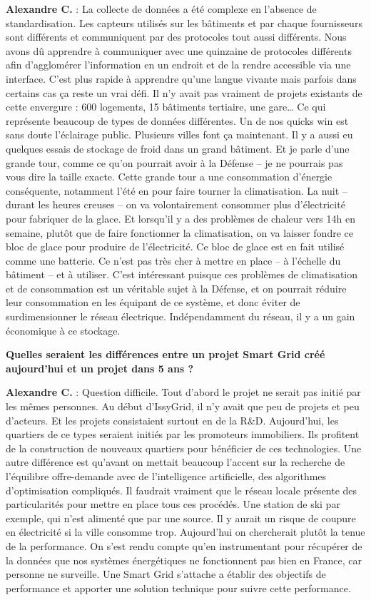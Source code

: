\textbf{Alexandre C.} :
La collecte de données a été complexe en l’absence de standardisation.
Les capteurs utilisés sur les bâtiments et par chaque fournisseurs sont différents et communiquent par des protocoles tout aussi différents.
Nous avons dû apprendre à communiquer avec une quinzaine de protocoles différents afin d’agglomérer l’information en un endroit
et de la rendre accessible via une interface.
C’est plus rapide à apprendre qu’une langue vivante mais parfois dans certains cas ça reste un vrai défi.
Il n’y avait pas vraiment de projets existants de cette envergure : 600 logements, 15 bâtiments tertiaire, une gare…
Ce qui représente beaucoup de types de données différentes.
Un de nos quicks win est sans doute l’éclairage public. Plusieurs villes font ça maintenant.
Il y a aussi eu quelques essais de stockage de froid dans un grand bâtiment.
Et je parle d’une grande tour, comme ce qu’on pourrait avoir à la Défense – je ne pourrais pas vous dire la taille exacte.
Cette grande tour a une consommation d’énergie conséquente, notamment l’été en pour faire tourner la climatisation.
La nuit – durant les heures creuses – on va volontairement consommer plus d’électricité pour fabriquer de la glace.
Et lorsqu’il y a des problèmes de chaleur vers 14h en semaine, plutôt que de faire fonctionner la climatisation,
on va laisser fondre ce bloc de glace pour produire de l’électricité. Ce bloc de glace est en fait utilisé comme une batterie.
Ce n’est pas très cher à mettre en place – à l’échelle du bâtiment – et à utiliser.
C’est intéressant puisque ces problèmes de climatisation et de consommation est un véritable sujet à la Défense,
et on pourrait réduire leur consommation en les équipant de ce système, et donc éviter de surdimensionner le réseau électrique.
Indépendamment du réseau, il y a un gain économique à ce stockage.

\textbf{Quelles seraient les différences entre un projet Smart Grid créé aujourd’hui et un projet dans 5 ans ?}

\textbf{Alexandre C.} :
Question difficile. Tout d'abord le projet ne serait pas initié par les mêmes personnes.
Au début d’IssyGrid, il n’y avait que peu de projets et peu d’acteurs. Et les projets consistaient surtout en de la R\&D.
Aujourd’hui, les quartiers de ce types seraient initiés par les promoteurs immobiliers.
Ils profitent de la construction de nouveaux quartiers pour bénéficier de ces technologies.
Une autre différence est qu’avant on mettait beaucoup l’accent sur la recherche de l’équilibre offre-demande avec de l’intelligence artificielle,
des algorithmes d’optimisation compliqués.
Il faudrait vraiment que le réseau locale présente des particularités pour mettre en place tous ces procédés.
Une station de ski par exemple, qui n’est alimenté que par une source.
Il y aurait un risque de coupure en électricité si la ville consomme trop.
Aujourd’hui on chercherait plutôt la tenue de la performance.
On s’est rendu compte qu’en instrumentant pour récupérer de la données que nos systèmes énergétiques
ne fonctionnent pas bien en France, car personne ne surveille.
Une Smart Grid s’attache a établir des objectifs de performance et apporter une solution technique pour suivre cette performance.


